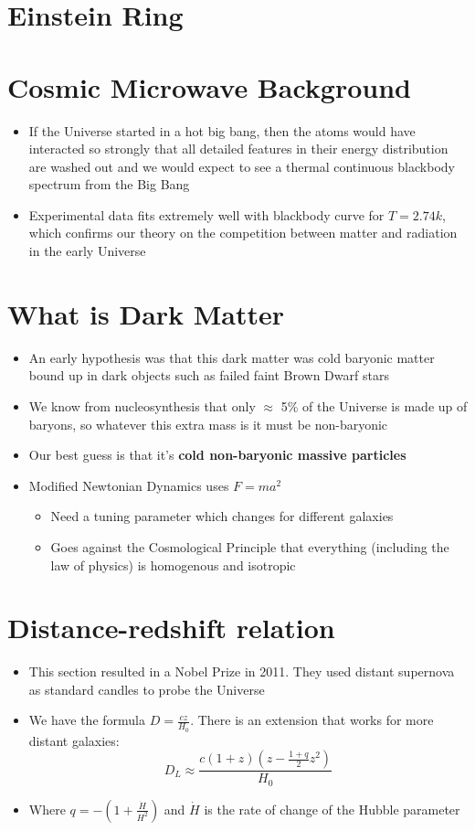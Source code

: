 \documentclass{article}
\begin{document}
\section{Einstein Ring}
\section{Cosmic Microwave Background}
\begin{itemize}
\item If the Universe started in a hot big bang, then the atoms would have interacted so strongly that all detailed features in their energy distribution are washed out and we would expect to see a thermal continuous blackbody spectrum from the Big Bang
\item Experimental data fits extremely well with blackbody curve for $T=2.74k$, which confirms our theory on the competition between matter and radiation in the early Universe
\end{itemize}
\section{What is Dark Matter}
\begin{itemize}
\item An early hypothesis was that this dark matter was cold baryonic matter bound up in dark objects such as failed faint Brown Dwarf stars
\item We know from nucleosynthesis that only $\approx$ 5\% of the Universe is made up of baryons, so whatever this extra mass is it must be
non-baryonic
\item Our best guess is that it's \textbf{cold non-baryonic massive particles}
\item Modified Newtonian Dynamics uses $F=ma^2$
\begin{itemize}
\item Need a tuning parameter which changes for different galaxies
\item Goes against the Cosmological Principle that everything (including the law
of physics) is homogenous and isotropic
\end{itemize}
\end{itemize}
\section{Distance-redshift relation}
\begin{itemize}
\item This section resulted in a Nobel Prize in 2011. They used distant supernova as standard candles to probe the Universe
\item We have the formula $D=\frac{cz}{H_0}$. There is an extension that works for more distant galaxies:
\begin{equation}
D_L \approx \frac{c(1+z)(z-\frac{1+q}{2}z^2)}{H_0}
\end{equation}
\item Where $q=-\left(1+\frac{\dot{H}}{H^2}\right)$ and $\dot{H}$ is the rate of change of the Hubble parameter
\end{itemize}
\end{document}
